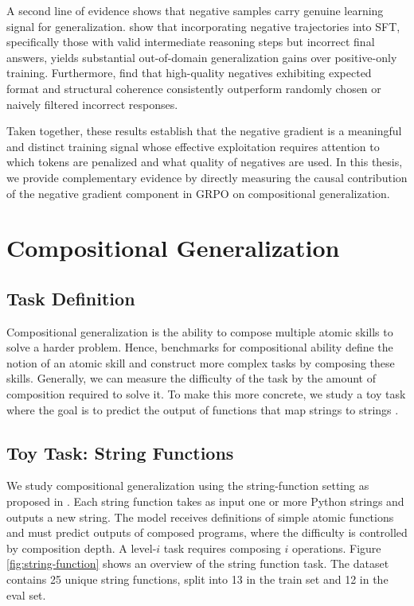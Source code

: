 \documentclass[12pt]{cmuthesis}
\begin{document}
A second line of evidence shows that negative samples carry genuine learning signal for generalization.
\citet{tian_learning_2026} show that incorporating negative trajectories into SFT, specifically those with valid intermediate reasoning steps but incorrect final answers, yields substantial out-of-domain generalization gains over positive-only training.
Furthermore, \citet{di_not_2026} find that high-quality negatives exhibiting expected format and structural coherence consistently outperform randomly chosen or naively filtered incorrect responses. 

Taken together, these results establish that the negative gradient is a meaningful and distinct training signal whose effective exploitation requires attention to which tokens are penalized and what quality of negatives are used.
In this thesis, we provide complementary evidence by directly measuring the causal contribution of the negative gradient component in GRPO on compositional generalization.


\chapter{Compositional Generalization}
\section{Task Definition}
Compositional generalization is the ability to compose multiple atomic skills to solve a harder problem. Hence, benchmarks for compositional ability define the notion of an atomic skill and construct more complex tasks by composing these skills. Generally, we can measure the difficulty of the task by the amount of composition required to solve it. To make this more concrete, we study a toy task where the goal is to predict the output of functions that map strings to strings \citep{yuanLLMsLearnNewSkills2025}.

\section{Toy Task: String Functions}
\label{sec:string-function}
We study compositional generalization using the string-function setting as proposed in \citet{yuanLLMsLearnNewSkills2025}. Each string function takes as input one or more Python strings and outputs a new string. The model receives definitions of simple atomic functions and must predict outputs of composed programs, where the difficulty is controlled by composition depth. A level-$i$ task requires composing $i$ operations. Figure \ref{fig:string-function} shows an overview of the string function task. The dataset contains 25 unique string functions, split into 13 in the train set and 12 in the eval set. 
\end{document}
